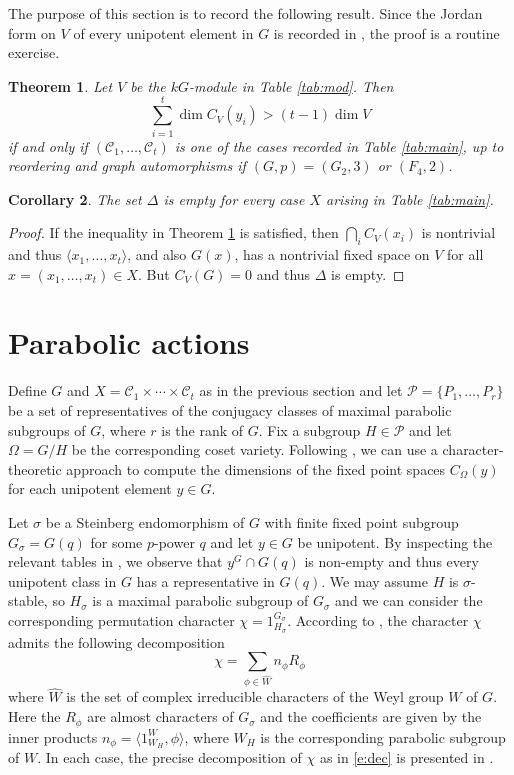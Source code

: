 \documentclass[twoside,a4paper,reqno,11pt]{amsart}
\newcommand{\s}{\sigma}
\renewcommand{\O}{\Omega}
\newcommand{\<}{\langle}
\renewcommand{\>}{\rangle}
\newcommand{\la}{\langle}
\newcommand{\ra}{\rangle}
\renewcommand{\:}{\colon}
\theoremstyle{plain}
\newtheorem{thm}{Theorem}[section]
\newtheorem{cor}[thm]{Corollary}
\theoremstyle{definition}
\begin{document}
The purpose of this section is to record the following result. Since the Jordan form on $V$ of every unipotent element in $G$ is recorded in \cite{Law1}, the proof is a routine exercise.

\begin{thm}\label{t:fixV}
Let $V$ be the $kG$-module in Table \ref{tab:mod}. Then 
\[
\sum_{i=1}^t \dim C_V(y_i) > (t-1)\dim V
\]
if and only if $(\mathcal{C}_1, \ldots, \mathcal{C}_t)$ is one of the cases recorded in Table \ref{tab:main}, up to reordering and graph automorphisms if $(G,p) = (G_2,3)$ or $(F_4,2)$. 
\end{thm}

\begin{cor}\label{c:fixV}
The set $\Delta$ is empty for every case $X$ arising in Table \ref{tab:main}.
\end{cor}

\begin{proof}
If the inequality in Theorem \ref{t:fixV} is satisfied, then $\bigcap_i C_V(x_i)$ is nontrivial and thus $\la x_1, \ldots, x_t \ra$, and also $G(x)$, has a nontrivial fixed space on $V$ for all $x = (x_1, \ldots, x_t) \in X$. But $C_V(G) = 0$ and thus $\Delta$ is empty.
\end{proof}

\section{Parabolic actions}\label{s:parab}

Define $G$ and $X = \mathcal{C}_1 \times \cdots \times \mathcal{C}_t$ as in the previous section and let $\mathcal{P} = \{P_1, \ldots, P_r\}$ be a set of representatives of the conjugacy classes of maximal parabolic subgroups of $G$, where $r$ is the rank of $G$. Fix a subgroup $H \in \mathcal{P}$ and let $\O = G/H$ be the corresponding coset variety. Following \cite{BGG1}, we can use a character-theoretic approach to compute the dimensions of the fixed point spaces $C_{\O}(y)$ for each unipotent element $y \in G$.

Let $\s$ be a Steinberg endomorphism of $G$ with finite fixed point subgroup $G_{\s} = G(q)$ for some $p$-power $q$ and let $y \in G$ be unipotent. By inspecting the relevant tables in \cite[Chapter 22]{LS_book}, we observe that $y^G \cap G(q)$ is non-empty and thus every unipotent class in $G$ has a representative in $G(q)$. We may assume $H$ is $\s$-stable, so $H_{\s}$ is a maximal parabolic subgroup of $G_{\s}$ and we can consider the corresponding permutation character $\chi = 1^{G_{\s}}_{H_{\s}}$. According to \cite[Lemma 2.4]{LLS2}, the character $\chi$ admits the following decomposition
\begin{equation}\label{e:dec}
\chi = \sum_{\phi \in \widehat{W}}n_{\phi}R_{\phi}
\end{equation}
where $\widehat{W}$ is the set of complex irreducible characters of the Weyl group  $W$ of $G$. Here the $R_{\phi}$ are almost characters of $G_{\s}$ and the coefficients are given by the inner products $n_{\phi} = \la 1^W_{W_H},\phi \ra$, where $W_H$ is the corresponding parabolic subgroup of $W$. In each case, the precise decomposition of $\chi$ as in \eqref{e:dec} is presented in \cite[Section 2]{LLS2}. 
\end{document}
